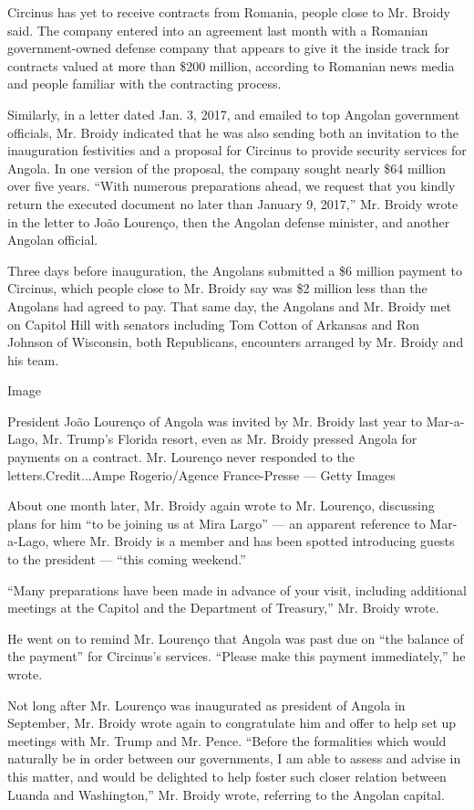 Circinus has yet to receive contracts from Romania, people close to Mr.
Broidy said. The company entered into an agreement last month with a
Romanian government-owned defense company that appears to give it the
inside track for contracts valued at more than \$200 million, according
to Romanian news media and people familiar with the contracting process.

Similarly, in a letter dated Jan. 3, 2017, and emailed to top Angolan
government officials, Mr. Broidy indicated that he was also sending both
an invitation to the inauguration festivities and a proposal for
Circinus to provide security services for Angola. In one version of the
proposal, the company sought nearly \$64 million over five years. ``With
numerous preparations ahead, we request that you kindly return the
executed document no later than January 9, 2017,'' Mr. Broidy wrote in
the letter to João Lourenço, then the Angolan defense minister, and
another Angolan official.

Three days before inauguration, the Angolans submitted a \$6 million
payment to Circinus, which people close to Mr. Broidy say was \$2
million less than the Angolans had agreed to pay. That same day, the
Angolans and Mr. Broidy met on Capitol Hill with senators including Tom
Cotton of Arkansas and Ron Johnson of Wisconsin, both Republicans,
encounters arranged by Mr. Broidy and his team.

Image

President João Lourenço of Angola was invited by Mr. Broidy last year to
Mar-a-Lago, Mr. Trump's Florida resort, even as Mr. Broidy pressed
Angola for payments on a contract. Mr. Lourenço never responded to the
letters.Credit...Ampe Rogerio/Agence France-Presse --- Getty Images

About one month later, Mr. Broidy again wrote to Mr. Lourenço,
discussing plans for him ``to be joining us at Mira Largo'' --- an
apparent reference to Mar-a-Lago, where Mr. Broidy is a member and has
been spotted introducing guests to the president --- ``this coming
weekend.''

``Many preparations have been made in advance of your visit, including
additional meetings at the Capitol and the Department of Treasury,'' Mr.
Broidy wrote.

He went on to remind Mr. Lourenço that Angola was past due on ``the
balance of the payment'' for Circinus's services. ``Please make this
payment immediately,'' he wrote.

Not long after Mr. Lourenço was inaugurated as president of Angola in
September, Mr. Broidy wrote again to congratulate him and offer to help
set up meetings with Mr. Trump and Mr. Pence. ``Before the formalities
which would naturally be in order between our governments, I am able to
assess and advise in this matter, and would be delighted to help foster
such closer relation between Luanda and Washington,'' Mr. Broidy wrote,
referring to the Angolan capital.

